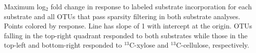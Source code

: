 Maximum log$_{2}$ fold change in response to labeled substrate incorporation
for each substrate and all OTUs that pass sparsity filtering in both substrate
analyses. Points colored by response. Line has slope of 1 with intercept at the
origin. OTUs falling in the top-right quadrant responded to both substrates
while those in the top-left and bottom-right responded to $^{13}$C-xylose and
$^{13}$C-cellulose, respectively.


